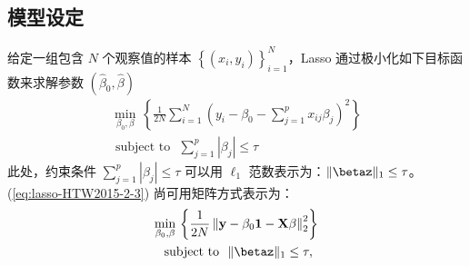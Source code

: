 \subsection{模型设定} 

给定一组包含 $N$ 个观察值的样本 $\left\{\left(x_{i}, y_{i}\right)\right\}_{i=1}^{N}$，Lasso 通过极小化如下目标函数来求解参数  $(\widehat{\beta}_{0}, \widehat{\beta})$ 
\begin{equation}\label{eq:lasso-HTW2015-2-3}%
	\begin{gathered}
\underset{\beta_{0}, \beta}{\operatorname{min}}\,
	\left\{\frac{1}{2 N} \sum_{i=1}^{N}\left(y_{i}-\beta_{0}-\sum_{j=1}^{p} x_{i j} \beta_{j}\right)^{2}\right\} \\
	\text { subject to } \,\, \sum_{j=1}^{p}\left|\beta_{j}\right| \leq \tau
	\end{gathered}
\end{equation}
此处，约束条件 $\sum_{j=1}^{p}\left|\beta_{j}\right| \leq \tau$ 可以用 $\ell_{1}$ 范数表示为：$\|\betaz\|_{1} \leq \tau$。(\ref{eq:lasso-HTW2015-2-3}) 尚可用矩阵方式表示为：
\begin{equation}\label{eq:lasso-HTW2015-2-4}
\begin{gathered}
\underset{\beta_{0}, \beta}{\operatorname{min}}\,
\left\{\frac{1}{2 N}\left\|\mathbf{y}-\beta_{0} \mathbf{1}-\mathbf{X} \beta\right\|_{2}^{2}\right\} \\
\text { subject to }\,\,\|\betaz\|_{1} \leq \tau,
\end{gathered}
\end{equation}

